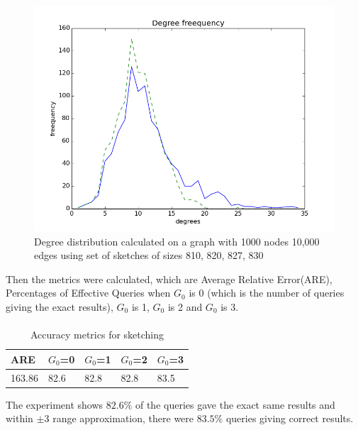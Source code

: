 \documentclass[12pt]{report}
\numberwithin{figure}{section}
\numberwithin{table}{section}
\begin{document}
\begin{figure}[H]
\centering
\includegraphics[scale=0.6]{images/n1000-e10000-sketches-810-820-823-827-830plot}
\caption[1000 nodes 10,000 edges with sketches of sizes 810, 820, 827, 830]{Degree distribution calculated on a graph with 1000 nodes 10,000 edges using set of sketches of sizes 810, 820, 827, 830}
\end{figure}

Then the metrics were calculated, which are Average Relative Error(ARE), Percentages of Effective Queries when $G_0$ is 0 (which is the number of queries giving the exact results), $G_0$ is 1, $G_0$ is 2 and $G_0$ is 3.

\paragraph{}

\begin{table}[H]
\centering
\begin{tabular}{|l|l|l|l|l|}
\hline
 ARE   & $G_0$=0 & $G_0$=1 & $G_0$=2 & $G_0$=3 \\ \hline
163.86 &   82.6  &   82.8  &   82.8  &   83.5  \\ \hline
\end{tabular}
\caption{Accuracy metrics for sketching}
\label{table:accuracy-metrics-for-sketching}
\end{table}


The experiment shows $82.6\%$ of the queries gave the exact same results and within $\pm3$ range approximation, there were $83.5\%$ queries giving correct results.
\end{document}
